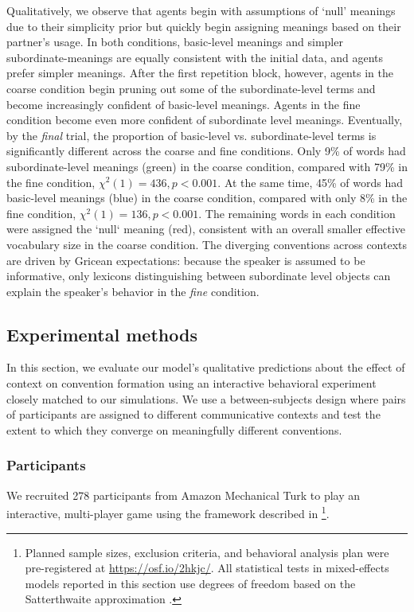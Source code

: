 Qualitatively, we observe that agents begin with assumptions of `null' meanings due to their simplicity prior but quickly begin assigning meanings based on their partner's usage.
In both conditions, basic-level meanings and simpler subordinate-meanings are equally consistent with the initial data, and agents prefer simpler meanings.
After the first repetition block, however, agents in the coarse condition begin pruning out some of the subordinate-level terms and become increasingly confident of basic-level meanings.
Agents in the fine condition become even more confident of subordinate level meanings.
Eventually, by the \emph{final} trial, the proportion of basic-level vs. subordinate-level terms is significantly different across the coarse and fine conditions.
Only 9\% of words had subordinate-level meanings (green) in the coarse condition, compared with 79\% in the fine condition, $\chi^2(1) = 436, p < 0.001$.
At the same time, 45\% of words had basic-level meanings (blue) in the coarse condition, compared with only 8\% in the fine condition, $\chi^2(1) = 136, p < 0.001$.
The remaining words in each condition were assigned the `null` meaning (red), consistent with an overall smaller effective vocabulary size in the coarse condition.
The diverging conventions across contexts are driven by Gricean expectations: because the speaker is assumed to be informative, only lexicons distinguishing between subordinate level objects can explain the speaker's behavior in the \emph{fine} condition.

\subsection{Experimental methods}

In this section, we evaluate our model's qualitative predictions about the effect of context on convention formation using an interactive behavioral experiment closely matched to our simulations.
We use a between-subjects design where pairs of participants are assigned to different communicative contexts and test the extent to which they converge on meaningfully different conventions.

\subsubsection{Participants}

We recruited 278 participants from Amazon Mechanical Turk to play an interactive, multi-player game using the framework described in \footnote{Planned sample sizes, exclusion criteria, and behavioral analysis plan were pre-registered at \url{https://osf.io/2hkjc/}. All statistical tests in mixed-effects models reported in this section use degrees of freedom based on the Satterthwaite approximation \cite{luke2017evaluating}.}.

